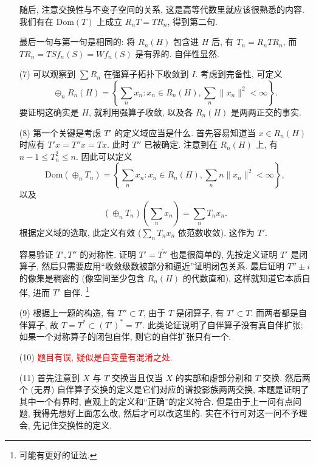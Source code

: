 \begin{enumerate}
    随后, 注意交换性与不变子空间的关系, 这是高等代数里就应该很熟悉的内容. 
    我们有在 $\mathrm{Dom}(T)$ 上成立 $R_nT=TR_n$, 得到第二句.

    最后一句与第一句是相同的: 将 $R_n(H)$ 包含进 $H$ 后, 有 $T_n=R_nTR_n$, 而 $TR_n=TSf_n(S)=Wf_n(S)$ 是有界的. 自伴性显然.
    \item[(7)] 可以观察到 $\sum R_n$ 在强算子拓扑下收敛到 $I$. 考虑到完备性, 可定义
    $$\oplus_n R_n(H)=\left\{\sum_n x_n: x_n\in R_n(H),\sum_n\|x_n\|^2<\infty\right\}.$$
    要证明这确实是 $H$, 就利用强算子收敛, 以及各 $R_n(H)$ 是两两正交的事实.
    \item[(8)] 第一个关键是考虑 $T'$ 的定义域应当是什么. 
    首先容易知道当 $x\in R_n(H)$ 时应有 $T'x=T''x=Tx$. 此时 $T''$ 已被确定. 
    注意到在 $R_n(H)$ 上, 有 $n-1\leqslant T_n^2\leqslant n$. 因此可以定义 
    $$\mathrm{Dom}(\oplus_nT_n)=\left\{\sum_n x_n:x_n\in R_n(H),\sum_n n\|x_n\|^2<\infty\right\},$$
    以及 $$(\oplus_nT_n)\left(\sum_n x_n\right)=\sum_n T_nx_n.$$
    根据定义域的选取, 此定义有效 ($\sum_n T_nx_n$ 依范数收敛). 这作为 $T'$.

    容易验证 $T',T''$ 的对称性. 证明 $T'=\overline{T''}$ 也是很简单的, 
    先按定义证明 $T'$ 是闭算子, 然后只需要应用“收敛级数被部分和逼近”证明闭包关系. 
    最后证明 $T''\pm i$ 的像集是稠密的 (像空间至少包含 $R_n(H)$ 的代数直和), 
    这样就知道它本质自伴, 进而 $T'$ 自伴. \footnote{可能有更好的证法.}
    \item[(9)] 根据上一题的构造, 有 $T''\subset T$, 
    由于 $T$ 是闭算子, 有 $T'\subset T$. 
    而两者都是自伴算子, 故 $T=T^*\subset (T')^*=T'$. 
    此类论证说明了自伴算子没有真自伴扩张; 如果一个对称算子的闭包自伴, 则它的自伴扩张只有一个.
    \item[(10)] \textcolor{red}{题目有误, 疑似是自变量有混淆之处.} 
    \item[(11)] 首先注意到 $X$ 与 $T$ 交换当且仅当 $X$ 的实部和虚部分别和 $T$ 交换. 
    然后两个 (无界) 自伴算子交换的定义是它们对应的谱投影族两两交换, 
    本题是证明了其中一个有界时, 直观上的定义和“正确”的定义符合. 
    但是由于上一问有点问题, 我得先想好上面怎么改, 然后才可以改这里的. 
    实在不行可对这一问不予理会, 先记住交换性的定义. 
\end{enumerate}
\printfootnotes